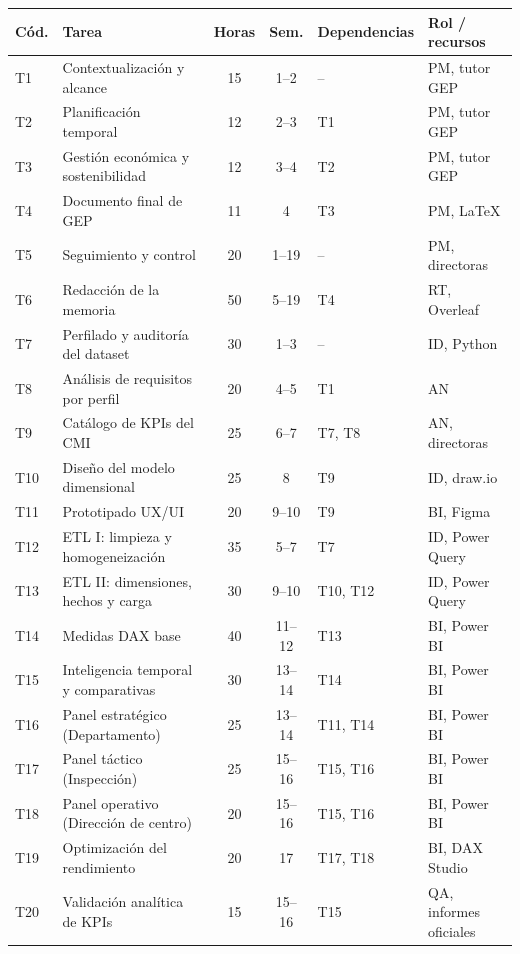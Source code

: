 \documentclass[12pt, a4paper, oneside]{report}
\begin{document}
\begin{table}[H]
\centering
\footnotesize
\renewcommand{\arraystretch}{1.0}
\setlength{\tabcolsep}{3.5pt}
\begin{tabularx}{\textwidth}{@{} l X c c l l @{}}
\toprule
\textbf{Cód.} & \textbf{Tarea} & \textbf{Horas} & \textbf{Sem.} & \textbf{Dependencias} & \textbf{Rol / recursos} \\ \midrule
T1 & Contextualización y alcance & 15 & 1--2 & -- & PM, tutor GEP \\
T2 & Planificación temporal & 12 & 2--3 & T1 & PM, tutor GEP \\
T3 & Gestión económica y sostenibilidad & 12 & 3--4 & T2 & PM, tutor GEP \\
T4 & Documento final de GEP & 11 & 4 & T3 & PM, \LaTeX \\
T5 & Seguimiento y control & 20 & 1--19 & -- & PM, directoras \\
T6 & Redacción de la memoria & 50 & 5--19 & T4 & RT, Overleaf \\
T7 & Perfilado y auditoría del dataset & 30 & 1--3 & -- & ID, Python \\
T8 & Análisis de requisitos por perfil & 20 & 4--5 & T1 & AN \\
T9 & Catálogo de KPIs del CMI & 25 & 6--7 & T7, T8 & AN, directoras \\
T10 & Diseño del modelo dimensional & 25 & 8 & T9 & ID, draw.io \\
T11 & Prototipado UX/UI & 20 & 9--10 & T9 & BI, Figma \\
T12 & ETL I: limpieza y homogeneización & 35 & 5--7 & T7 & ID, Power Query \\
T13 & ETL II: dimensiones, hechos y carga & 30 & 9--10 & T10, T12 & ID, Power Query \\
T14 & Medidas DAX base & 40 & 11--12 & T13 & BI, Power BI \\
T15 & Inteligencia temporal y comparativas & 30 & 13--14 & T14 & BI, Power BI \\
T16 & Panel estratégico (Departamento) & 25 & 13--14 & T11, T14 & BI, Power BI \\
T17 & Panel táctico (Inspección) & 25 & 15--16 & T15, T16 & BI, Power BI \\
T18 & Panel operativo (Dirección de centro) & 20 & 15--16 & T15, T16 & BI, Power BI \\
T19 & Optimización del rendimiento & 20 & 17 & T17, T18 & BI, DAX Studio \\
T20 & Validación analítica de KPIs & 15 & 15--16 & T15 & QA, informes oficiales \\

\end{tabularx}
\end{table}
\end{document}
